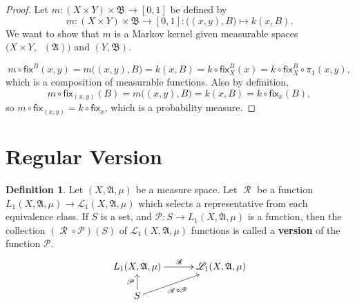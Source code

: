\documentclass[
twoside=true,
paper=letter,
fontsize=9pt,
pagesize=auto,
leqno,
openany,
headsepline,
overfullrule,
]{scrbook}
\theoremstyle{plain}
\theoremstyle{plain}
\theoremstyle{definition}
\theoremstyle{bfnoteitalic}
\theoremstyle{bfnoteroman}
\newtheorem{defnboldnote}[thm]{Definition}
\newcommand{\term}[1]{\textbf{#1}\index{#1}}
\newcommand{\sigalg}[1]{\mathfrak{#1}}
\newcommand{\cali}[1]{\mathscr{#1}}
\newcommand{\sfop}[1]{\mathsf{#1}}
\newcommand{\preimage}[1]{\mathop{#1^{\leftarrow}}}
\newcommand{\sigmaalgebra}{\sigalg{A}}
\newcommand{\sigmaalgebraii}{\sigalg{B}}
\newcommand{\Lone}{L_1(\measurespace, \sigmaalgebra, \measure)}
\newcommand{\caliLone}{\cali{L}_1(\measurespace, \sigmaalgebra, \measure)}
\newcommand{\measurespace}{X}
\newcommand{\measurespaceii}{Y}
\newcommand{\mspaceelt}{x}
\newcommand{\mspaceeltii}{y}
\newcommand{\measure}{\mu}
\newcommand{\setii}{B}
\newcommand{\regular}{\mathop{\cali{R}}}
\newcommand{\projectionone}{\pi_1}
\newcommand{\markovkernel}{k}
\newcommand{\markovkernelii}{m}
\newcommand{\fixinthefirst}[1]{\sfop{fix}_{#1}}
\newcommand{\fixinthesecond}[1]{\sfop{fix}^{#1}}
\begin{document}
\begin{proof}
Let
$\markovkernelii:
(\measurespace\times\measurespaceii) \times \sigmaalgebraii 
\to
[0,1]$
be defined by
\[
\markovkernelii:
(\measurespace\times\measurespaceii) \times \sigmaalgebraii 
\to
[0,1]
: 
\bigl((\mspaceelt,\mspaceeltii),\setii\bigr)\mapsto 
\markovkernel(\mspaceelt,\setii).
\]
We want to show that 
$\markovkernelii$ is a Markov kernel given measurable spaces
$\bigl(\measurespace\times\measurespaceii, \preimage\projectionone(\sigmaalgebra)\bigr)$
and
$(\measurespaceii, \sigmaalgebraii)$.

\[
\markovkernelii\circ
\fixinthesecond{\setii}(\mspaceelt,\mspaceeltii)
=
\markovkernelii\bigl((\mspaceelt,\mspaceeltii),\setii\bigr)
=
\markovkernel(\mspaceelt,\setii)
=
\markovkernel\circ\fixinthesecond{\setii}_\measurespace(\mspaceelt)
=
\markovkernel\circ\fixinthesecond{\setii}_\measurespace\circ\projectionone(\mspaceelt,\mspaceeltii),
\]
which is a composition of measurable functions.
Also by definition,
\[
\markovkernelii\circ\fixinthefirst{(\mspaceelt,\mspaceeltii)}(\setii)
=
\markovkernelii\bigl((\mspaceelt,\mspaceeltii),\setii\bigr)
=
\markovkernel(\mspaceelt,\setii)
=
\markovkernel\circ\fixinthefirst{\mspaceelt}(\setii),
\]
so
$\markovkernelii\circ\fixinthefirst{(\mspaceelt,\mspaceeltii)}
=
\markovkernel\circ\fixinthefirst{\mspaceelt}$, which is a probability measure.
\end{proof}




\section{Regular Version}
\begin{defnboldnote}\label{version}
Let $(\measurespace,\sigmaalgebra,\measure)$ be a measure space.
Let 
$\regular$ be a function $\Lone\to\caliLone$ which selects a representative from each equivalence class.  
If $S$ is a set, and $\cali{P}: S \to \Lone$ is a function, then
the collection $(\regular\circ\cali{P})(S)$ of
$\caliLone$ functions is called a \term{version} of the function $\cali{P}$.
\[
\xymatrix@R=16pt@C=30pt{ 
\Lone \ar[r]^{\regular} & \caliLone \\
S \ar[ur]_-{\ \regular\circ\cali{F}} \ar[u]^{\cali{P}} & \\
}
\]
\end{defnboldnote}
\end{document}
